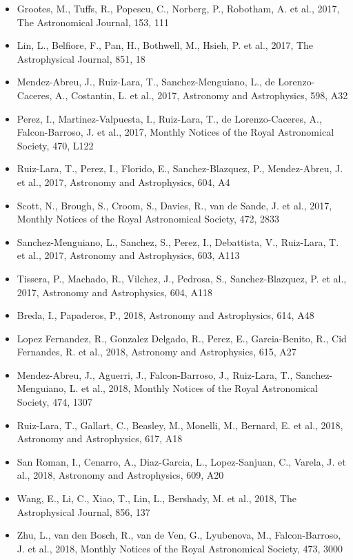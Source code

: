 \documentclass{letter}
\begin{document}
\begin{enumerate}
\begin{itemize}
\item Grootes, M., Tuffs, R., Popescu, C., Norberg, P., Robotham, A. et al., 2017, The Astronomical Journal, 153, 111
\item Lin, L., Belfiore, F., Pan, H., Bothwell, M., Hsieh, P. et al., 2017, The Astrophysical Journal, 851, 18
\item Mendez-Abreu, J., Ruiz-Lara, T., Sanchez-Menguiano, L., de Lorenzo-Caceres, A., Costantin, L. et al., 2017, Astronomy and Astrophysics, 598, A32
\item Perez, I., Martinez-Valpuesta, I., Ruiz-Lara, T., de Lorenzo-Caceres, A., Falcon-Barroso, J. et al., 2017, Monthly Notices of the Royal Astronomical Society, 470, L122
\item Ruiz-Lara, T., Perez, I., Florido, E., Sanchez-Blazquez, P., Mendez-Abreu, J. et al., 2017, Astronomy and Astrophysics, 604, A4
\item Scott, N., Brough, S., Croom, S., Davies, R., van de Sande, J. et al., 2017, Monthly Notices of the Royal Astronomical Society, 472, 2833
\item Sanchez-Menguiano, L., Sanchez, S., Perez, I., Debattista, V., Ruiz-Lara, T. et al., 2017, Astronomy and Astrophysics, 603, A113
\item Tissera, P., Machado, R., Vilchez, J., Pedrosa, S., Sanchez-Blazquez, P. et al., 2017, Astronomy and Astrophysics, 604, A118
\item Breda, I., Papaderos, P., 2018, Astronomy and Astrophysics, 614, A48
\item Lopez Fernandez, R., Gonzalez Delgado, R., Perez, E., Garcia-Benito, R., Cid Fernandes, R. et al., 2018, Astronomy and Astrophysics, 615, A27
\item Mendez-Abreu, J., Aguerri, J., Falcon-Barroso, J., Ruiz-Lara, T., Sanchez-Menguiano, L. et al., 2018, Monthly Notices of the Royal Astronomical Society, 474, 1307
\item Ruiz-Lara, T., Gallart, C., Beasley, M., Monelli, M., Bernard, E. et al., 2018, Astronomy and Astrophysics, 617, A18
\item San Roman, I., Cenarro, A., Diaz-Garcia, L., Lopez-Sanjuan, C., Varela, J. et al., 2018, Astronomy and Astrophysics, 609, A20
\item Wang, E., Li, C., Xiao, T., Lin, L., Bershady, M. et al., 2018, The Astrophysical Journal, 856, 137
\item Zhu, L., van den Bosch, R., van de Ven, G., Lyubenova, M., Falcon-Barroso, J. et al., 2018, Monthly Notices of the Royal Astronomical Society, 473, 3000

\end{itemize}
\end{enumerate}
\end{document}
